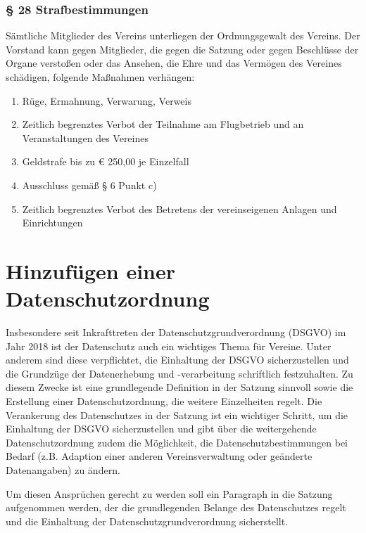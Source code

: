 \documentclass[10pt,a4paper,parskip=half]{scrartcl}
\newcommand{\change}[1]{
  \begin{adjustwidth}{20pt}{20pt}
    #1
  \end{adjustwidth}
}
\begin{document}
\change{
  \subsubsection*{§ 28 Strafbestimmungen}
  Sämtliche Mitglieder des Vereins unterliegen der Ordnungsgewalt des Vereins.
  Der Vorstand kann gegen Mitglieder,
  die gegen die Satzung oder gegen Beschlüsse der Organe verstoßen oder das Ansehen,
  die Ehre und das Vermögen des Vereines schädigen,
  folgende Maßnahmen verhängen:
  \begin{enumerate}[label=\alph*),noitemsep]
    \item Rüge, Ermahnung, Verwarung, Verweis
    \item Zeitlich begrenztes Verbot der Teilnahme am Flugbetrieb und an Veranstaltungen des Vereines
    \item Geldstrafe bis zu € 250,00 je Einzelfall
    \item Ausschluss gemäß § 6 Punkt c)
    \item Zeitlich begrenztes Verbot des Betretens der vereinseigenen Anlagen und Einrichtungen
  \end{enumerate}
}
\clearpage
\section{Hinzufügen einer Datenschutzordnung}
Insbesondere seit Inkrafttreten der Datenschutzgrundverordnung (DSGVO) im Jahr 2018 ist der Datenschutz auch ein wichtiges Thema für Vereine. Unter anderem sind diese verpflichtet, die Einhaltung der DSGVO sicherzustellen und die Grundzüge der Datenerhebung und -verarbeitung schriftlich festzuhalten. Zu diesem Zwecke ist eine grundlegende Definition in der Satzung sinnvoll sowie die Erstellung einer Datenschutzordnung, die weitere Einzelheiten regelt. Die Verankerung des Datenschutzes in der Satzung ist ein wichtiger Schritt,  um die Einhaltung der DSGVO sicherzustellen und gibt über die weitergehende Datenschutzordnung zudem die Möglichkeit, die Datenschutzbestimmungen bei Bedarf (z.B. Adaption einer anderen Vereinsverwaltung oder geänderte Datenangaben) zu ändern.

Um diesen Ansprüchen gerecht zu werden soll ein Paragraph in die Satzung aufgenommen werden, der die grundlegenden Belange des Datenschutzes regelt und die Einhaltung der Datenschutzgrundverordnung sicherstellt.
\end{document}
